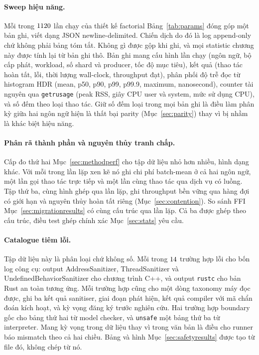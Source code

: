 \paragraph{Sweep hiệu năng.}
Mỗi trong $1120$ lần chạy của thiết kế factorial Bảng~\ref{tab:params} đóng góp một
bản ghi, viết dạng JSON newline-delimited. Chiến dịch do đó là log append-only chứ không phải
bảng tóm tắt. Không gì được gộp khi ghi, và mọi statistic chương này được
tính lại từ bản ghi thô. Bản ghi mang cấu hình lần chạy (ngôn ngữ, bộ cấp phát,
workload, số shard và producer, tốc độ mục tiêu), kết quả (thao tác hoàn tất, lỗi,
thời lượng wall-clock, throughput đạt), phân phối độ trễ đọc từ histogram HDR
(mean, p50, p90, p99, p99.9, maximum, nanosecond), counter tài nguyên qua
\texttt{getrusage} (peak RSS, giây CPU user và system, mức
sử dụng CPU), và số đếm theo loại thao tác. Giữ số đếm loại trong mọi bản ghi là
điều làm phân kỳ giữa hai ngôn ngữ hiện là thất bại parity
(Mục~\ref{sec:parity}) thay vì bị nhầm là khác biệt hiệu năng.

\paragraph{Phân rã thành phần và nguyên thủy tranh chấp.}
Cấp đo thứ hai Mục~\ref{sec:methodperf} cho tập dữ liệu nhỏ hơn nhiều, hình dạng
khác. Với mỗi trong \BudgetRepeats{} lần lặp xen kẽ nó ghi chi phí batch-mean
ở cả hai ngôn ngữ, một lần gọi thao tác trực tiếp và một lần cùng thao tác qua
dịch vụ có luồng. Tập thứ ba, cùng hình ghép qua \ContentionRepeats{} lần lặp, ghi
throughput bền vững qua hàng đợi có giới hạn và nguyên thủy hoàn tất riêng
(Mục~\ref{sec:contention}). So sánh FFI Mục~\ref{sec:migrationresults} có
cùng cấu trúc qua \FfiOpRepeats{} lần lặp. Cả ba được ghép theo cấu trúc, điều test ghép chính xác
Mục~\ref{sec:stats} yêu cầu.

\paragraph{Catalogue tiêm lỗi.}
Tập dữ liệu này là phân loại chứ không số. Mỗi trong $14$ trường hợp lỗi cho bốn
log
công cụ: output AddressSanitizer, ThreadSanitizer và UndefinedBehaviorSanitizer cho chương trình C++,
và output \texttt{rustc} cho bản Rust an toàn tương ứng. Mỗi trường hợp cũng cho một
dòng taxonomy máy đọc được, ghi ba kết quả sanitiser, giai đoạn phát hiện,
kết quả compiler với mã chẩn đoán kích hoạt, và kỳ vọng đăng ký trước
nghiên cứu. Hai trường hợp boundary gốc cho bảng thứ hai từ model checker, và
\texttt{unsafe} một bảng thứ ba từ interpreter. Mang
kỳ vọng trong dữ liệu thay vì trong văn bản là điều cho runner báo mismatch
theo cả hai chiều. Bảng và hình Mục~\ref{sec:safetyresults} được tạo từ
file đó, không chép từ nó.

